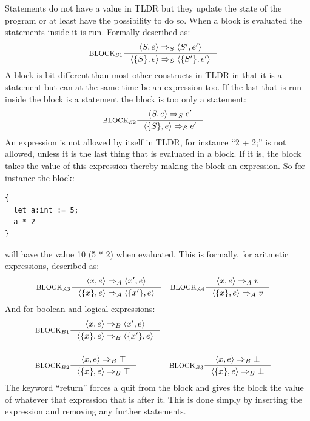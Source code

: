 Statements do not have a value in TLDR but they update the state of the program or at least have the possibility to do so. When a block is evaluated the statements inside it is run. Formally described as:
\begin{align*}
&\inference[$\text{BLOCK}_{S1}$]{\Braket{S,e} \Rightarrow_S \Braket{S',e'}}
                                {\Braket{\{S\},e} \Rightarrow_S \Braket{\{S'\},e'}}
\end{align*}
A block is bit different than most other constructs in TLDR in that it is a statement but can at the same time be an expression too. If the last that is run inside the block is a statement the block is too only a statement:
\begin{align*}
&\inference[$\text{BLOCK}_{S2}$]{\Braket{S,e} \Rightarrow_S e'}
                                {\Braket{\{S\},e} \Rightarrow_S e'}
\end{align*}
An expression is not allowed by itself in TLDR, for instance \enquote{2 + 2;} is not allowed, unless it is the last thing that is evaluated in a block. If it is, the block takes the value of this expression thereby making the block an expression. So for instance the block:
\begin{lstlisting}
{
  let a:int := 5;
  a * 2
}
\end{lstlisting}
will have the value 10 (5 * 2) when evaluated. This is formally, for aritmetic expressions, described as:
\begin{align*}
&\inference[$\text{BLOCK}_{A3}$]{\Braket{x,e} \Rightarrow_A \Braket{x',e}}
                         {\Braket{\{x\},e} \Rightarrow_A \Braket{\{x'\},e}}
&
&\inference[$\text{BLOCK}_{A4}$]{\Braket{x,e} \Rightarrow_A v}
                         {\Braket{\{x\},e} \Rightarrow_A v}
\end{align*}
And for boolean and logical expressions:
\begin{align*}
&\inference[$\text{BLOCK}_{B1}$]{\Braket{x,e} \Rightarrow_B \Braket{x',e}}
                         {\Braket{\{x\},e} \Rightarrow_B \Braket{\{x'\},e}}
\\\\
&\inference[$\text{BLOCK}_{B2}$]{\Braket{x,e} \Rightarrow_B \top}
                         {\Braket{\{x\},e} \Rightarrow_B \top}
&
&\inference[$\text{BLOCK}_{B3}$]{\Braket{x,e} \Rightarrow_B \bot}
                         {\Braket{\{x\},e} \Rightarrow_B \bot}
\end{align*}
The keyword \enquote{return} forces a quit from the block and gives the block the value of whatever that expression that is after it. This is done simply by inserting the expression and removing any further statements.
